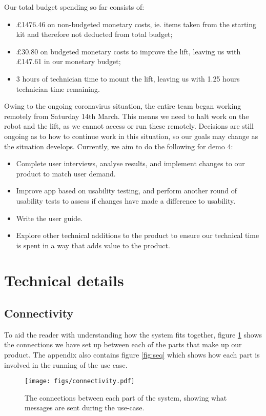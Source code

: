 \documentclass{article}
\begin{document}
Our total budget spending so far consists of:
\begin{itemize}
  \item \pounds 1476.46 on non-budgeted monetary costs, ie. items taken from the starting kit and therefore not deducted from total budget;
  \item \pounds 30.80 on budgeted monetary costs to improve the lift, leaving us with \pounds 147.61 in our monetary budget; 
  \item 3 hours of technician time to mount the lift, leaving us with 1.25 hours technician time remaining. 
\end{itemize}

Owing to the ongoing coronavirus situation, the entire team began working remotely from Saturday 14th March. This means we need to halt work on the robot and the lift, as we cannot access or run these remotely. Decisions are still ongoing as to how to continue work in this situation, so our goals may change as the situation develops. Currently, we aim to do the following for demo 4:
\begin{itemize}
  \item Complete user interviews, analyse results, and implement changes to our product to match user demand.
  \item Improve app based on usability testing, and perform another round of usability tests to assess if changes have made a difference to usability. 
  \item Write the user guide. 
  \item Explore other technical additions to the product to ensure our technical time is spent in a way that adds value to the product. 
\end{itemize}

\section{Technical details}
\subsection{Connectivity}
To aid the reader with understanding how the system fits together, figure \ref{fig:connect} shows the connections we have set up between each of the parts that make up our product. The appendix also contains figure \ref{fig:seq} which shows how each part is involved in the running of the use case.
\begin{figure}
  \begin{center}
    \texttt{[image: figs/connectivity.pdf]}
  \end{center}
  \caption{The connections between each part of the system, showing what messages are sent during the use-case.}
  \label{fig:connect}
\end{figure}
\end{document}

